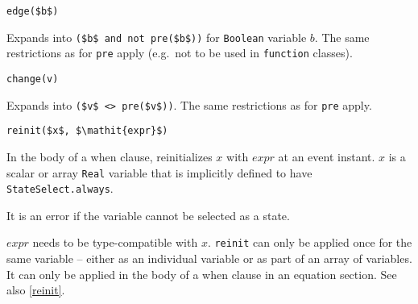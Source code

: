 \begin{operatordefinition}[edge]
\begin{synopsis}\begin{lstlisting}
edge($b$)
\end{lstlisting}\end{synopsis}
\begin{semantics}
Expands into \lstinline!($b$ and not pre($b$))! for \lstinline!Boolean! variable $b$.  The same restrictions as for \lstinline!pre! apply (e.g.\ not to be used in \lstinline!function! classes).
\end{semantics}
\end{operatordefinition}

\begin{operatordefinition}[change]
\begin{synopsis}\begin{lstlisting}
change(v)
\end{lstlisting}\end{synopsis}
\begin{semantics}
Expands into \lstinline!($v$ <> pre($v$))!.  The same restrictions as for \lstinline!pre! apply.
\end{semantics}
\end{operatordefinition}

\begin{operatordefinition}[reinit]
\begin{synopsis}\begin{lstlisting}
reinit($x$, $\mathit{expr}$)
\end{lstlisting}\end{synopsis}
\begin{semantics}
In the body of a when clause, reinitializes $x$ with $\mathit{expr}$ at an event instant.  $x$ is a scalar or array \lstinline!Real! variable that is implicitly defined to have \lstinline!StateSelect.always!.
\begin{nonnormative}
It is an error if the variable cannot be selected as a state.
\end{nonnormative}
$\mathit{expr}$ needs to be type-compatible with $x$.  \lstinline!reinit! can only be applied once for the same variable -- either as an individual variable or as part of an array of variables.  It can only be applied in the body of a when clause in an equation section.  See also \cref{reinit}.
\end{semantics}
\end{operatordefinition}


